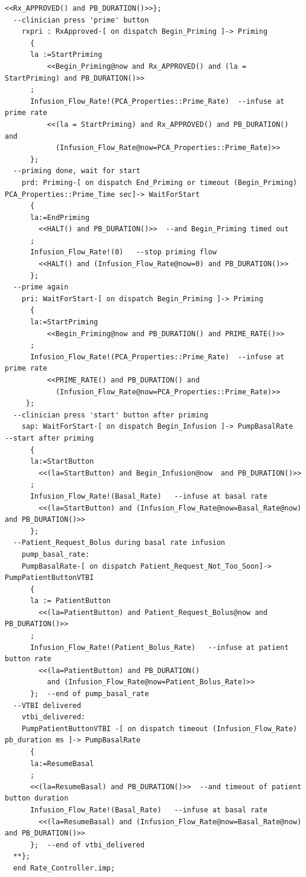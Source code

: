 \begin{lstlisting}[language=aadl, frame=single, gobble=0, caption={\lstinline{Rate_Controller} thread from \lstinline{PCA_Operation} component with BLESS assertions}]
      <<Rx_APPROVED() and PB_DURATION()>>};  
  --clinician press 'prime' button
    rxpri : RxApproved-[ on dispatch Begin_Priming ]-> Priming  
      {
      la :=StartPriming
          <<Begin_Priming@now and Rx_APPROVED() and (la = StartPriming) and PB_DURATION()>>
      ; 
      Infusion_Flow_Rate!(PCA_Properties::Prime_Rate)  --infuse at prime rate
          <<(la = StartPriming) and Rx_APPROVED() and PB_DURATION() and
            (Infusion_Flow_Rate@now=PCA_Properties::Prime_Rate)>>   
      };
  --priming done, wait for start
    prd: Priming-[ on dispatch End_Priming or timeout (Begin_Priming) PCA_Properties::Prime_Time sec]-> WaitForStart  
      {
      la:=EndPriming
        <<HALT() and PB_DURATION()>>  --and Begin_Priming timed out
      ;
      Infusion_Flow_Rate!(0)   --stop priming flow
        <<HALT() and (Infusion_Flow_Rate@now=0) and PB_DURATION()>>
      };
  --prime again
    pri: WaitForStart-[ on dispatch Begin_Priming ]-> Priming  
      {
      la:=StartPriming
          <<Begin_Priming@now and PB_DURATION() and PRIME_RATE()>>
      ; 
      Infusion_Flow_Rate!(PCA_Properties::Prime_Rate)  --infuse at prime rate
          <<PRIME_RATE() and PB_DURATION() and
            (Infusion_Flow_Rate@now=PCA_Properties::Prime_Rate)>>   
     };
  --clinician press 'start' button after priming    
    sap: WaitForStart-[ on dispatch Begin_Infusion ]-> PumpBasalRate  --start after priming
      {
      la:=StartButton
        <<(la=StartButton) and Begin_Infusion@now  and PB_DURATION()>>    
      ;
      Infusion_Flow_Rate!(Basal_Rate)   --infuse at basal rate
        <<(la=StartButton) and (Infusion_Flow_Rate@now=Basal_Rate@now) and PB_DURATION()>>
      };
  --Patient_Request_Bolus during basal rate infusion
    pump_basal_rate: 
    PumpBasalRate-[ on dispatch Patient_Request_Not_Too_Soon]-> PumpPatientButtonVTBI
      {
      la := PatientButton 
        <<(la=PatientButton) and Patient_Request_Bolus@now and PB_DURATION()>>    
      ;
      Infusion_Flow_Rate!(Patient_Bolus_Rate)   --infuse at patient button rate
        <<(la=PatientButton) and PB_DURATION()
          and (Infusion_Flow_Rate@now=Patient_Bolus_Rate)>>     
      };  --end of pump_basal_rate
  --VTBI delivered
    vtbi_delivered: 
    PumpPatientButtonVTBI -[ on dispatch timeout (Infusion_Flow_Rate) pb_duration ms ]-> PumpBasalRate
      {
      la:=ResumeBasal
      ;
      <<(la=ResumeBasal) and PB_DURATION()>>  --and timeout of patient button duration
      Infusion_Flow_Rate!(Basal_Rate)   --infuse at basal rate
        <<(la=ResumeBasal) and (Infusion_Flow_Rate@now=Basal_Rate@now) and PB_DURATION()>>   
      };  --end of vtbi_delivered
  **};
  end Rate_Controller.imp;
\end{lstlisting} 
\label{listing:rate_controller}
\doublespacing

